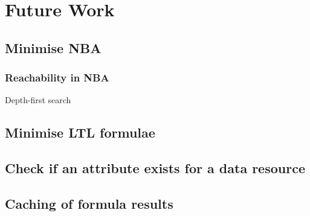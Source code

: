 \section{Future Work}
\subsection{Minimise NBA}
\cite{fritz2002state, hopcroft1971n, kan2016partial}
\subsubsection{Reachability in NBA}
Depth-first search
\subsection{Minimise LTL formulae}

\subsection{Check if an attribute exists for a data resource}

\subsection{Caching of formula results}

